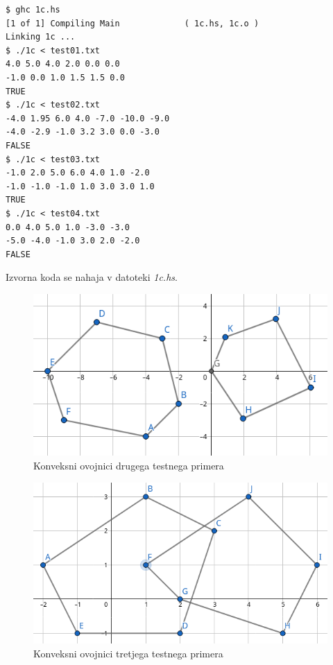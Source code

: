 \documentclass{article}
\begin{document}
\begin{lstlisting}
$ ghc 1c.hs
[1 of 1] Compiling Main             ( 1c.hs, 1c.o )
Linking 1c ...
$ ./1c < test01.txt
4.0 5.0 4.0 2.0 0.0 0.0
-1.0 0.0 1.0 1.5 1.5 0.0
TRUE
$ ./1c < test02.txt
-4.0 1.95 6.0 4.0 -7.0 -10.0 -9.0
-4.0 -2.9 -1.0 3.2 3.0 0.0 -3.0
FALSE
$ ./1c < test03.txt
-1.0 2.0 5.0 6.0 4.0 1.0 -2.0
-1.0 -1.0 -1.0 1.0 3.0 3.0 1.0
TRUE
$ ./1c < test04.txt
0.0 4.0 5.0 1.0 -3.0 -3.0
-5.0 -4.0 -1.0 3.0 2.0 -2.0
FALSE
\end{lstlisting}

Izvorna koda se nahaja v datoteki \textit{1c.hs}.

\begin{figure}
	\centering
	\includegraphics[scale=0.5]{./figs/test02.png}
	\caption{Konveksni ovojnici drugega testnega primera}
	\label{fig:test02}
\end{figure}

\begin{figure}
	\centering
	\includegraphics[scale=0.4]{./figs/test03.png}
	\caption{Konveksni ovojnici tretjega testnega primera}
	\label{fig:test03}
\end{figure}
\end{document}
